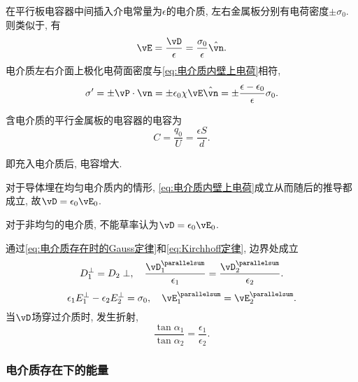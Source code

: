 \documentclass[../Electromagnetism.tex]{subfiles}
\begin{document}
\begin{ex}
	在平行板电容器中间插入介电常量为$\epsilon$的电介质, 左右金属板分别有电荷密度$\pm\sigma_{0}$. 则类似于, 有
	\[ \vE = \frac{\vD}{\epsilon} = \frac{\sigma_0}{\epsilon}\hat{\vn}. \]
	电介质左右介面上极化电荷面密度与\eqref{eq:电介质内壁上电荷}相符,
	\[ \sigma' = \pm\vP\cdot\vn = \pm \epsilon_0\chi\vE\hat{\vn} = \pm\frac{\epsilon - \epsilon_0}{\epsilon}\sigma_0. \]
\end{ex}
\begin{finale}
	\begin{corollary}[含有电介质的电容]
		含电介质的平行金属板的电容器的电容为
		\[ C = \frac{q_0}{U} = \frac{\epsilon S}{d}. \]
	\end{corollary}
\end{finale}
即充入电介质后, 电容增大.
\begin{remark}
	对于导体埋在均匀电介质内的情形, \eqref{eq:电介质内壁上电荷}成立从而随后的推导都成立, 故$\vD = \epsilon_0 \vE_0$.
\end{remark}
\begin{pitfall}
	对于非均匀的电介质, 不能草率认为$\vD = \epsilon_0 \vE_0$.
\end{pitfall}
通过\eqref{eq:电介质存在时的Gauss定律}和\eqref{eq:Kirchhoff定律}, 边界处成立
\[ D_1^\perp = D_2\perp,\quad \frac{\vD_1^{\parallelsum}}{\epsilon_1} = \frac{\vD_2^{\parallelsum}}{\epsilon_2}. \]
\[ \epsilon_1 E_1^\perp - \epsilon_2 E_2^\perp = \sigma_0,\quad \vE_1^{\parallelsum} = \vE_2^{\parallelsum}. \]
当$\vD$场穿过介质时, 发生折射,
\[ \frac{\tan \alpha_1}{\tan \alpha_2} = \frac{\epsilon_1}{\epsilon_2}. \]


\subsubsection{电介质存在下的能量} %
\label{ssub:电介质存在下的能量}
\end{document}
